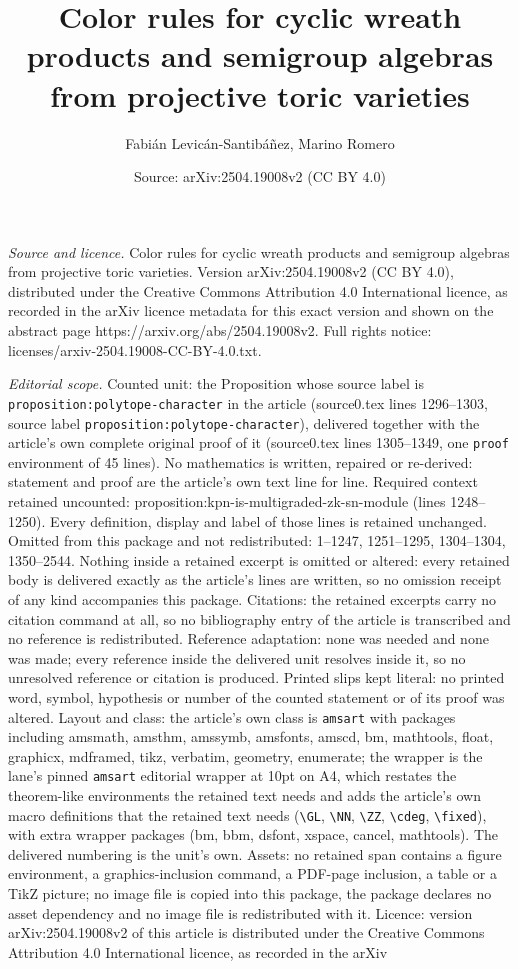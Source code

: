 \documentclass[10pt,a4paper]{amsart}
\title[Color rules for cyclic wreath products and semigroup algebra]{Color rules for cyclic wreath products and semigroup algebras from projective toric varieties}
\author{Fabi\'an Levic\'an-Santib\'a\~nez, Marino Romero}
\date{Source: arXiv:2504.19008v2 (CC BY 4.0)}
\begin{document}
\maketitle

\noindent\emph{Source and licence.} Color rules for cyclic wreath products and semigroup algebras from projective toric varieties. Version arXiv:2504.19008v2 (CC BY 4.0), distributed under the Creative Commons Attribution 4.0 International licence, as recorded in the arXiv licence metadata for this exact version and shown on the abstract page https://arxiv.org/abs/2504.19008v2. Full rights notice: licenses/arxiv-2504.19008-CC-BY-4.0.txt.\par\smallskip

\noindent\textit{Editorial scope.} Counted unit: the Proposition whose source label is \texttt{proposition:polytope-character} in the article (source0.tex lines 1296--1303, source label \texttt{proposition:polytope-character}), delivered together with the article's own complete original proof of it (source0.tex lines 1305--1349, one \texttt{proof} environment of 45 lines). No mathematics is written, repaired or re-derived: statement and proof are the article's own text line for line. Required context retained uncounted: proposition:kpn-is-multigraded-zk-sn-module (lines 1248--1250). Every definition, display and label of those lines is retained unchanged. Omitted from this package and not redistributed: 1--1247, 1251--1295, 1304--1304, 1350--2544. Nothing inside a retained excerpt is omitted or altered: every retained body is delivered exactly as the article's lines are written, so no omission receipt of any kind accompanies this package. Citations: the retained excerpts carry no citation command at all, so no bibliography entry of the article is transcribed and no reference is redistributed. Reference adaptation: none was needed and none was made; every reference inside the delivered unit resolves inside it, so no unresolved reference or citation is produced. Printed slips kept literal: no printed word, symbol, hypothesis or number of the counted statement or of its proof was altered. Layout and class: the article's own class is \texttt{amsart} with packages including amsmath, amsthm, amssymb, amsfonts, amscd, bm, mathtools, float, graphicx, mdframed, tikz, verbatim, geometry, enumerate; the wrapper is the lane's pinned \texttt{amsart} editorial wrapper at 10pt on A4, which restates the theorem-like environments the retained text needs and adds the article's own macro definitions that the retained text needs (\texttt{\textbackslash GL}, \texttt{\textbackslash NN}, \texttt{\textbackslash ZZ}, \texttt{\textbackslash cdeg}, \texttt{\textbackslash fixed}), with extra wrapper packages (bm, bbm, dsfont, xspace, cancel, mathtools). The delivered numbering is the unit's own. Assets: no retained span contains a figure environment, a graphics-inclusion command, a PDF-page inclusion, a table or a TikZ picture; no image file is copied into this package, the package declares no asset dependency and no image file is redistributed with it. Licence: version arXiv:2504.19008v2 of this article is distributed under the Creative Commons Attribution 4.0 International licence, as recorded in the arXiv 
\end{document}

